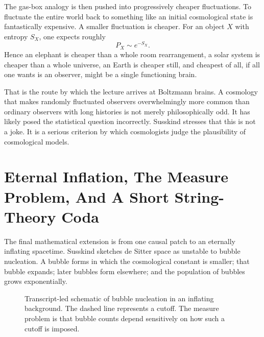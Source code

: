 The gas-box analogy is then pushed into progressively cheaper fluctuations. To fluctuate the entire world back to something like an initial cosmological state is fantastically expensive. A smaller fluctuation is cheaper. For an object \(X\) with entropy \(S_X\), one expects roughly
\begin{equation}
P_X\sim e^{-S_X}.
\end{equation}
Hence an elephant is cheaper than a whole room rearrangement, a solar system is cheaper than a whole universe, an Earth is cheaper still, and cheapest of all, if all one wants is an observer, might be a single functioning brain.

That is the route by which the lecture arrives at Boltzmann brains. A cosmology that makes randomly fluctuated observers overwhelmingly more common than ordinary observers with long histories is not merely philosophically odd. It has likely posed the statistical question incorrectly. Susskind stresses that this is not a joke. It is a serious criterion by which cosmologists judge the plausibility of cosmological models.

\section{Eternal Inflation, The Measure Problem, And A Short String-Theory Coda}

The final mathematical extension is from one causal patch to an eternally inflating spacetime. Susskind sketches de Sitter space as unstable to bubble nucleation. A bubble forms in which the cosmological constant is smaller; that bubble expands; later bubbles form elsewhere; and the population of bubbles grows exponentially.

\begin{figure}
\centering
{}
\caption{Transcript-led schematic of bubble nucleation in an inflating background. The dashed line represents a cutoff. The measure problem is that bubble counts depend sensitively on how such a cutoff is imposed.}
\end{figure}

